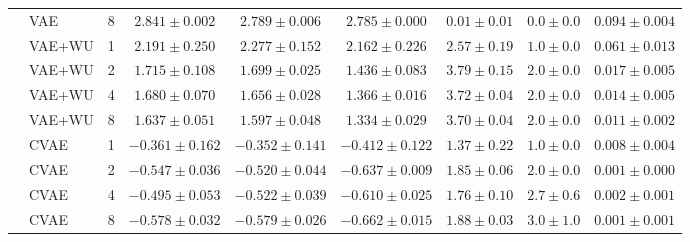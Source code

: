 \begin{tabular}{llrcccccc}
 & VAE & 8 & $2.841\pm0.002$ & $2.789\pm0.006$ & $2.785\pm0.000$ & $0.01\pm0.01$ & $0.0\pm0.0$ & $0.094\pm0.004$ \\
\cmidrule{2-9}
 & VAE+WU & 1 & $2.191\pm0.250$ & $2.277\pm0.152$ & $2.162\pm0.226$ & $2.57\pm0.19$ & $1.0\pm0.0$ & $0.061\pm0.013$ \\
 & VAE+WU & 2 & $1.715\pm0.108$ & $1.699\pm0.025$ & $1.436\pm0.083$ & $3.79\pm0.15$ & $2.0\pm0.0$ & $0.017\pm0.005$ \\
 & VAE+WU & 4 & $1.680\pm0.070$ & $1.656\pm0.028$ & $1.366\pm0.016$ & $3.72\pm0.04$ & $2.0\pm0.0$ & $0.014\pm0.005$ \\
 & VAE+WU & 8 & $1.637\pm0.051$ & $1.597\pm0.048$ & $1.334\pm0.029$ & $3.70\pm0.04$ & $2.0\pm0.0$ & $0.011\pm0.002$ \\
\cmidrule{2-9}
 & CVAE & 1 & $-0.361\pm0.162$ & $-0.352\pm0.141$ & $-0.412\pm0.122$ & $1.37\pm0.22$ & $1.0\pm0.0$ & $0.008\pm0.004$ \\
 & CVAE & 2 & $-0.547\pm0.036$ & $-0.520\pm0.044$ & $-0.637\pm0.009$ & $1.85\pm0.06$ & $2.0\pm0.0$ & $0.001\pm0.000$ \\
 & CVAE & 4 & $-0.495\pm0.053$ & $-0.522\pm0.039$ & $-0.610\pm0.025$ & $1.76\pm0.10$ & $2.7\pm0.6$ & $0.002\pm0.001$ \\
 & CVAE & 8 & $-0.578\pm0.032$ & $-0.579\pm0.026$ & $\mathbf{-0.662\pm0.015}$ & $1.88\pm0.03$ & $3.0\pm1.0$ & $0.001\pm0.001$ \\
\bottomrule
\end{tabular}
